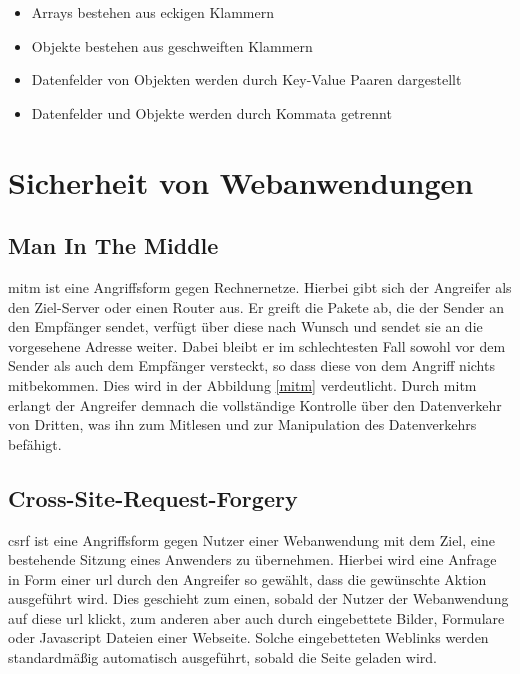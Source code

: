 \begin{itemize}
	\item Arrays bestehen aus eckigen Klammern
	\item Objekte bestehen aus geschweiften Klammern
	\item Datenfelder von Objekten werden durch Key-Value Paaren dargestellt
	\item Datenfelder und Objekte werden durch Kommata getrennt
\end{itemize}

\section{Sicherheit von Webanwendungen}
\subsection{Man In The Middle}
\gls{mitm} ist eine Angriffsform gegen Rechnernetze.
Hierbei gibt sich der Angreifer als den Ziel-Server oder einen Router aus.
Er greift die Pakete ab, die der Sender an den Empfänger sendet, verfügt über diese nach Wunsch und sendet sie an die vorgesehene Adresse weiter. Dabei bleibt er im schlechtesten Fall sowohl vor dem Sender als auch dem Empfänger versteckt, so dass diese von dem Angriff nichts mitbekommen. Dies wird in der Abbildung \ref{mitm} verdeutlicht.
Durch \gls{mitm} erlangt der Angreifer demnach die vollständige Kontrolle über den Datenverkehr von Dritten, was ihn zum Mitlesen und zur Manipulation des Datenverkehrs befähigt.


\subsection{Cross-Site-Request-Forgery}
\gls{csrf} ist eine Angriffsform gegen Nutzer einer Webanwendung mit dem Ziel, eine bestehende Sitzung eines Anwenders zu übernehmen.
Hierbei wird eine Anfrage in Form einer \gls{url} durch den Angreifer so gewählt, dass die gewünschte Aktion ausgeführt wird.
Dies geschieht zum einen, sobald der Nutzer der Webanwendung auf diese \gls{url} klickt, zum anderen aber auch durch eingebettete Bilder, Formulare oder Javascript Dateien einer Webseite. Solche eingebetteten Weblinks werden standardmäßig automatisch ausgeführt, sobald die Seite geladen wird.

